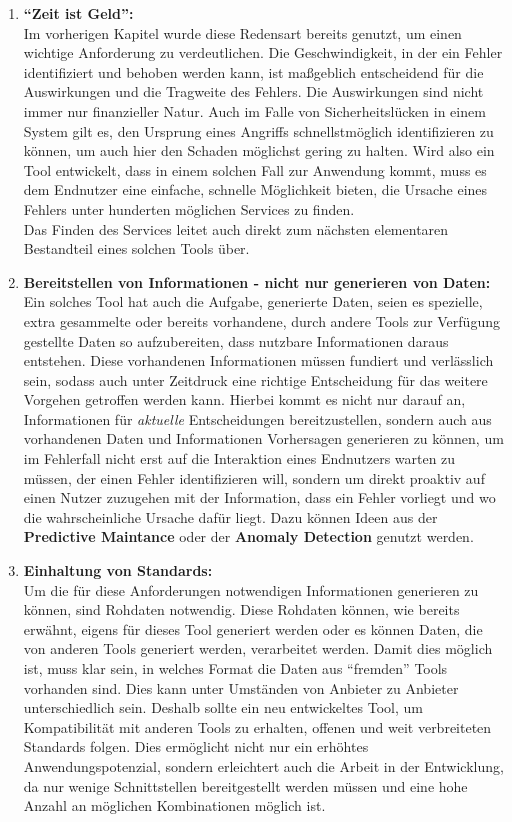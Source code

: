 \begin{enumerate}

\item \textbf{\enquote{Zeit ist Geld}:}\\
Im vorherigen Kapitel wurde diese Redensart bereits genutzt, um einen wichtige Anforderung zu verdeutlichen. Die Geschwindigkeit, in der ein Fehler identifiziert und behoben werden kann, ist maßgeblich entscheidend für die Auswirkungen und die Tragweite des Fehlers. Die Auswirkungen sind nicht immer nur finanzieller Natur. Auch im Falle von Sicherheitslücken in einem System gilt es, den Ursprung eines Angriffs schnellstmöglich identifizieren zu können, um auch hier den Schaden möglichst gering zu halten. Wird also ein Tool entwickelt, dass in einem solchen Fall zur Anwendung kommt, muss es dem Endnutzer eine einfache, schnelle Möglichkeit bieten, die Ursache eines Fehlers unter hunderten möglichen Services zu finden. \\
Das Finden des Services leitet auch direkt zum nächsten elementaren Bestandteil eines solchen Tools über.

\item \textbf{Bereitstellen von Informationen - nicht nur generieren von Daten:}\\
Ein solches Tool hat auch die Aufgabe, generierte Daten, seien es spezielle, extra gesammelte oder bereits vorhandene, durch andere Tools zur Verfügung gestellte Daten so aufzubereiten, dass nutzbare Informationen daraus entstehen. Diese vorhandenen Informationen müssen fundiert und verlässlich sein, sodass auch unter Zeitdruck eine richtige Entscheidung für das weitere Vorgehen getroffen werden kann. Hierbei kommt es nicht nur darauf an, Informationen für \textit{aktuelle} Entscheidungen bereitzustellen, sondern auch aus vorhandenen Daten und Informationen Vorhersagen generieren zu können, um im Fehlerfall nicht erst auf die Interaktion eines Endnutzers warten zu müssen, der einen Fehler identifizieren will, sondern um direkt proaktiv auf einen Nutzer zuzugehen mit der Information, dass ein Fehler vorliegt und wo die wahrscheinliche Ursache dafür liegt. Dazu können Ideen aus der \textbf{Predictive Maintance} oder der \textbf{Anomaly Detection} genutzt werden.

\item \textbf{Einhaltung von Standards:}\\
Um die für diese Anforderungen notwendigen Informationen generieren zu können, sind Rohdaten notwendig. Diese Rohdaten können, wie bereits erwähnt, eigens für dieses Tool generiert werden oder es können Daten, die von anderen Tools generiert werden, verarbeitet werden. Damit dies möglich ist, muss klar sein, in welches Format die Daten aus \enquote{fremden} Tools vorhanden sind. Dies kann unter Umständen von Anbieter zu Anbieter unterschiedlich sein. Deshalb sollte ein neu entwickeltes Tool, um Kompatibilität mit anderen Tools zu erhalten, offenen und weit verbreiteten Standards folgen. Dies ermöglicht nicht nur ein erhöhtes Anwendungspotenzial, sondern erleichtert auch die Arbeit in der Entwicklung, da nur wenige Schnittstellen bereitgestellt werden müssen und eine hohe Anzahl an möglichen Kombinationen möglich ist.


\end{enumerate}
